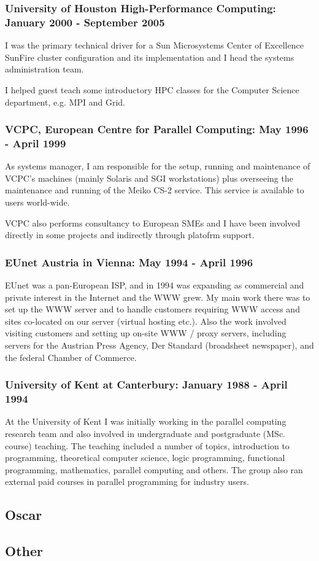 \documentclass[10pt,english]{article}
\begin{document}
\subsubsection*{University of Houston High-Performance Computing:
  January 2000 - September 2005}

    I was the primary technical driver for a Sun Microsystems Center
    of Excellence SunFire cluster configuration and its implementation
    and I head the systems administration team.

    I helped guest teach some introductory HPC classes for the Computer
    Science department, e.g. MPI and Grid.

\subsubsection*{VCPC, European Centre for Parallel Computing:
  May 1996 - April 1999}

    As systems manager, I am responsible for the setup, running and
    maintenance of VCPC's machines (mainly Solaris and SGI
    workstations) plus overseeing the maintenance and running of the
    Meiko CS-2 service. This service is available to users world-wide.

    VCPC also performs consultancy to European SMEs and I have been
    involved directly in some projects and indirectly through platofrm
    support.

\subsubsection*{EUnet Austria in Vienna:
  May 1994 - April 1996}

    EUnet was a pan-European ISP, and in 1994 was expanding as
    commercial and private interest in the Internet and the WWW grew.
    My main work there was to set up the WWW server and to handle
    customers requiring WWW access and sites co-located on our server
    (virtual hosting etc.).  Also the work involved visiting customers
    and setting up on-site WWW / proxy servers, including servers for
    the Austrian Press Agency, Der Standard (broadsheet newspaper),
    and the federal Chamber of Commerce.

\subsubsection*{University of Kent at Canterbury:
  January 1988 - April 1994}

    At the University of Kent I was initially working in the parallel
    computing research team and also involved in undergraduate and
    postgraduate (MSc. course) teaching. The teaching included a
    number of topics, introduction to programming, theoretical
    computer science, logic programming, functional programming,
    mathematics, parallel computing and others.  The group also ran
    external paid courses in parallel programming for industry users.

\subsection{Oscar}

\subsection{Other}
\end{document}
